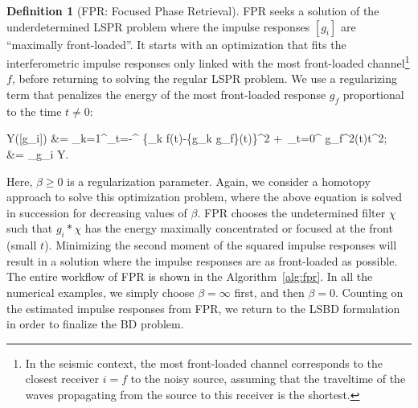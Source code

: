 \documentclass{article}
\theoremstyle{definition}
\newtheorem{defn}{Definition}
\newcommand{\inear}{f}
\def\vecc#1{[#1]}
\begin{document}
{\begin{defn}[FPR: Focused Phase Retrieval]\label{def:fpr} 
	FPR seeks a solution of the 
	underdetermined LSPR problem
	where the impulse responses $\vecc{g_i}$ are ``maximally front-loaded''.
	It starts with an optimization that 
	fits
	the interferometric impulse responses only linked with 
	the most front-loaded channel\footnote{In the seismic context, 
	the most front-loaded channel corresponds to the closest receiver
	$i=\inear$
	to the noisy source, assuming that the traveltime of the waves 
	propagating from the source to this receiver is the shortest.}
	$\inear$, 
	before returning to solving the regular LSPR problem.
	We use  
	a regularizing term that penalizes the energy of the most front-loaded 
	response $g_{\inear}$ proportional to the time $t\ne 0$:
	\begin{flalign}
	\label{eqn:fpr}
		Y(\vecc{{g}_i}) &= \sum_{k=1}^{\Nr}\sum_{t=-\tau}^{\tau} 
		\{_{k \inear}(t)-\{g_k \otimes g_\inear\}(t)\}^2  
		+ \beta\,\sum_{t=0}^{\tau} g_{\inear}^2(t)t^2; \\
		\vecc{\hat{g}_{i}} &=  _{g_{i}} \qquad Y.  
	\end{flalign}
	Here, $\beta\ge 0$ is a regularization parameter.
	Again, we consider a homotopy approach to solve this optimization problem,
	where the above equation is solved in succession for decreasing values of $\beta$.
FPR chooses the 
undetermined filter $\chi$ such that
	$g_i \ast \chi$ has the energy maximally concentrated or focused at the front (small $t$).
%
Minimizing  
the second moment of the squared impulse responses will result in a solution 
where the impulse responses are 
as front-loaded as possible.
%
%
The entire 
workflow of FPR is 
shown in the Algorithm~\ref{alg:fpr}.
%
In all the numerical examples, we simply choose
$\beta=\infty$ first, and then $\beta=0$.
%
Counting on the estimated impulse responses from FPR, we return to the LSBD formulation 
in order to finalize the BD problem.

\end{defn} 



}
\end{document}
